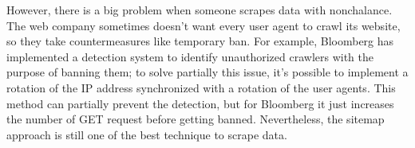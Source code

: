 However, there is a big problem when someone scrapes data with nonchalance. 
The web company sometimes doesn't want every user agent to crawl its website, so they take countermeasures like temporary ban. 
For example, Bloomberg has implemented a detection system to identify unauthorized crawlers with the purpose of banning them; to solve partially this issue, it's possible to implement a rotation of the IP address synchronized with a rotation of the user agents. 
This method can partially prevent the detection, but for Bloomberg it just increases the number of GET request before getting banned. 
Nevertheless, the sitemap approach is still one of the best technique to scrape data.
